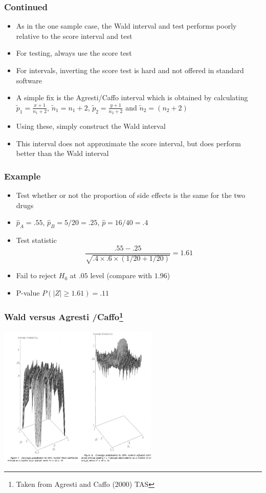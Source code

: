 \documentclass[aspectratio=169]{beamer}
\begin{document}
\begin{frame}\frametitle{Continued}
  \begin{itemize}
  \item As in the one sample case, the Wald interval and test performs poorly
    relative to the score interval and test
  \item For testing, always use the score test
  \item For intervals, inverting the score test is hard and not offered in standard software
  \item A simple fix is the Agresti/Caffo interval which is obtained by calculating $\tilde p_1 = \frac{x + 1}{n_1 + 2}$, $\tilde n_1 = n_1 + 2$, $\tilde p_2 = \frac{y + 1}{n_2 + 2}$ and $\tilde n_2 = (n_2 + 2)$
  \item Using these, simply construct the Wald interval  
  \item This interval does not approximate the score interval, but does
    perform better than the Wald interval
  \end{itemize}
\end{frame}
 

\begin{frame}\frametitle{Example} 
  \begin{itemize}
  \item Test whether or not the proportion of side effects is the same
    for the two drugs
  \item $\hat p_A = .55$, $\hat p_B = 5 / 20 = .25$, $\hat p = 16 / 40 = .4$
  \item Test statistic
    $$
    \frac{.55 - .25}{\sqrt{.4 \times .6 \times (1 / 20 + 1 / 20)}} = 1.61
    $$
  \item Fail to reject $H_0$ at $.05$ level (compare with $1.96$)
  \item P-value $P(|Z| \geq 1.61) = .11$
  \end{itemize}
\end{frame}

\begin{frame}\frametitle{Wald versus Agresti /Caffo\footnote{Taken from Agresti and Caffo (2000) TAS }}
\begin{center}
\includegraphics[width=3in]{waldTwoSample2.pdf}
\end{center}
\end{frame}
\end{document}
